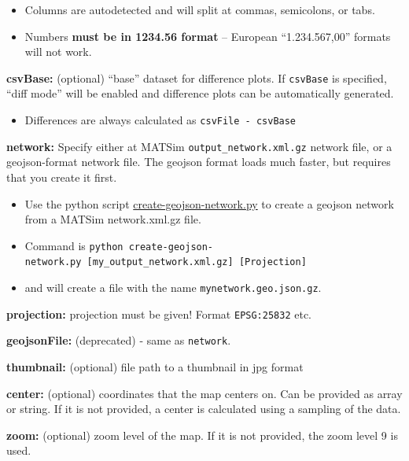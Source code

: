 \begin{itemize}
\tightlist
\item
  Columns are autodetected and will split at commas, semicolons, or
  tabs.
\item
  Numbers \textbf{must be in 1234.56 format} -- European
  ``1.234.567,00'' formats will not work.
\end{itemize}

\noindent\textbf{csvBase:} (optional) ``base'' dataset for difference plots. If
\texttt{csvBase} is specified, ``diff mode'' will be enabled and
difference plots can be automatically generated.

\begin{itemize}
\tightlist
\item
  Differences are always calculated as
  \texttt{\textquotesingle{}csvFile\ -\ csvBase\textquotesingle{}}
\end{itemize}

\noindent\textbf{network:} Specify either at MATSim
\texttt{output\_network.xml.gz} network file, or a geojson-format
network file. The geojson format loads much faster, but requires that
you create it first.

\begin{itemize}
\tightlist
\item
  Use the python script
  \href{https://raw.githubusercontent.com/simwrapper/simwrapper/master/scripts/create-geojson-network.py}{create-geojson-network.py}
  to create a geojson network from a MATSim network.xml.gz file.
\item
  Command is
  \texttt{python\ create-geojson-network.py\ {[}my\_output\_network.xml.gz{]}\ {[}Projection{]}}
\item
  and will create a file with the name \texttt{mynetwork.geo.json.gz}.
\end{itemize}

\noindent\textbf{projection:} projection must be given! Format
\texttt{EPSG:25832} etc.

\noindent\textbf{geojsonFile:} (deprecated) - same as \texttt{network}.

\noindent\textbf{thumbnail:} (optional) file path to a thumbnail in jpg format

\noindent\textbf{center:} (optional) coordinates that the map centers on. Can be
provided as array or string. If it is not provided, a center is
calculated using a sampling of the data.

\noindent\textbf{zoom:} (optional) zoom level of the map. If it is not provided,
the zoom level 9 is used.

